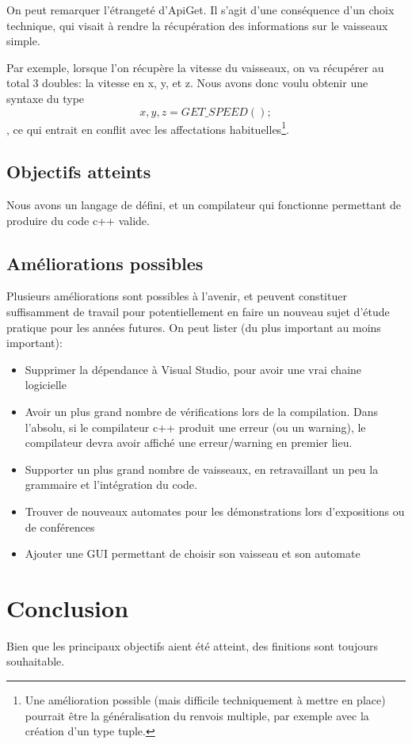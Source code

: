 \documentclass[a4paper,11pt]{article}
\begin{document}
        On peut remarquer l'étrangeté d'ApiGet. Il s'agit d'une conséquence d'un choix technique, qui visait à rendre la récupération des informations sur le vaisseaux simple. 
        
        Par exemple, lorsque l'on récupère la vitesse du vaisseaux, on va récupérer au total 3 doubles: la vitesse en x, y, et z. Nous avons donc voulu obtenir une syntaxe du type \[ x,y,z = GET\_SPEED(); \], ce qui entrait en conflit avec les affectations habituelles\footnote{Une amélioration possible (mais difficile techniquement à mettre en place) pourrait être la généralisation du renvois multiple, par exemple avec la création d'un type tuple.}.



    \subsection{Objectifs atteints}
        Nous avons un langage de défini, et un compilateur qui fonctionne permettant de produire du code c++ valide.

    \subsection{Améliorations possibles}
        Plusieurs améliorations sont possibles à l'avenir, et peuvent constituer suffisamment de travail pour potentiellement en faire un nouveau sujet d'étude pratique pour les années futures.
        On peut lister (du plus important au moins important):
        \begin{itemize}
            \item Supprimer la dépendance à Visual Studio, pour avoir une vrai chaine logicielle
            \item Avoir un plus grand nombre de vérifications lors de la compilation. Dans l'absolu, si le compilateur c++ produit une erreur (ou un warning), le compilateur devra avoir affiché une erreur/warning en premier lieu.
            \item Supporter un plus grand nombre de vaisseaux, en retravaillant un peu la grammaire et l'intégration du code.
						\item Trouver de nouveaux automates pour les démonstrations lors d'expositions ou de conférences 
						\item Ajouter une GUI permettant de choisir son vaisseau et son automate
        \end{itemize}

\section{Conclusion}
    Bien que les principaux objectifs aient été atteint, des finitions sont toujours souhaitable.
\end{document}
